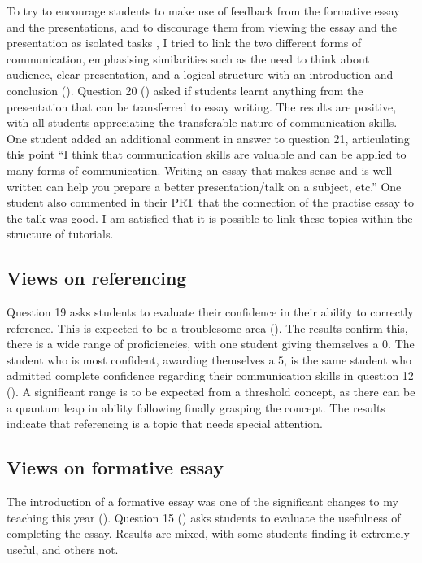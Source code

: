 To try to encourage students to make use of feedback from the formative essay and the presentations, and to discourage them from viewing the essay and the presentation as isolated tasks \citep[cf.][]{Housell2003}, I tried to link the two different forms of communication, emphasising similarities such as the need to think about audience, clear presentation, and a logical structure with an introduction and conclusion (). Question 20 () asked if students learnt anything from the presentation that can be transferred to essay writing. The results are positive, with all students appreciating the transferable nature of communication skills. One student added an additional comment in answer to question 21, articulating this point ``I think that communication skills are valuable and can be applied to many forms of communication. Writing an essay that makes sense and is well written can help you prepare a better presentation/talk on a subject, etc.'' One student also commented in their PRT that the connection of the practise essay to the talk was good. I am satisfied that it is possible to link these topics within the structure of tutorials.

\subsection{Views on referencing}\label{sec:referencing}

Question 19 asks students to evaluate their confidence in their ability to correctly reference. This is expected to be a troublesome area (). The results confirm this, there is a wide range of proficiencies, with one student giving themselves a $0$. The student who is most confident, awarding themselves a $5$, is the same student who admitted complete confidence regarding their communication skills in question 12 (). A significant range is to be expected from a threshold concept, as there can be a quantum leap in ability following finally grasping the concept. The results indicate that referencing is a topic that needs special attention.

\subsection{Views on formative essay}\label{sec:views-form}

The introduction of a formative essay was one of the significant changes to my teaching this year (). Question 15 () asks students to evaluate the usefulness of completing the essay. Results are mixed, with some students finding it extremely useful, and others not.

